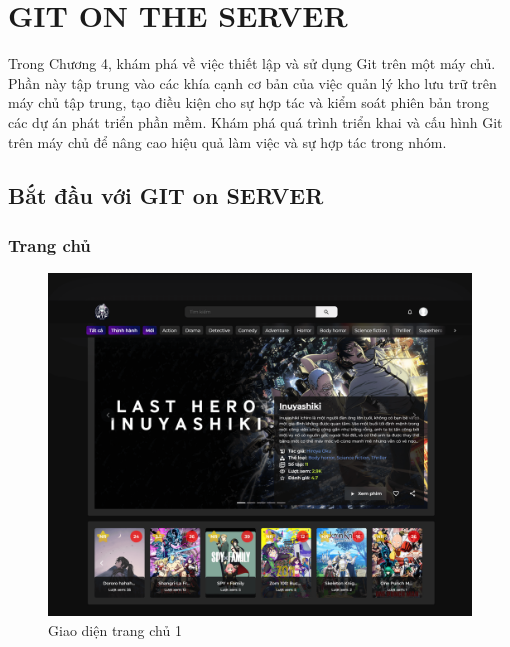 \chapter{GIT ON THE SERVER}
Trong Chương 4, khám phá về việc thiết lập và sử dụng Git trên một máy chủ. Phần này tập trung vào các khía cạnh cơ bản của việc quản lý kho lưu trữ trên máy chủ tập trung, tạo điều kiện cho sự hợp tác và kiểm soát phiên bản trong các dự án phát triển phần mềm. Khám phá quá trình triển khai và cấu hình Git trên máy chủ để nâng cao hiệu quả làm việc và sự hợp tác trong nhóm.
\section{Bắt đầu với GIT on SERVER}


\subsection{Trang chủ}

\begin{figure}[H]
    \centering
    \includegraphics[scale=0.16]{img/chuong4/homePageCarosel.png}
    \caption{Giao diện trang chủ 1}
\end{figure}

